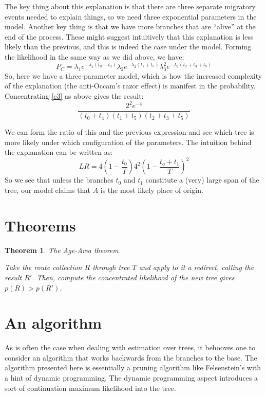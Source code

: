 \documentclass[11pt]{article}
\newtheorem{theorem}{Theorem}
\begin{document}
The key thing about this explanation is that there are three separate migratory events needed to explain things, so we need three exponential parameters in the model. Another key thing is that we have more branches that are ``alive'' at the end of the process. These might suggest intuitively that this explanation is less likely than the previous, and this is indeed the case under the model. Forming the likelihood in the
same way as we did above, we have:
\begin{equation} \label{e3}
P_C = \lambda_1e^{-\lambda_1(t_0+t_4)} \lambda_2 e^{-\lambda_2 (t_1+t_5)}\lambda_3^2 e^{-\lambda_3 (t_2+t_3+t_8)}
\end{equation}
So, here we have a three-parameter model, which is how the increased complexity of the explanation (the anti-Occam's razor effect) is manifest in the probability. Concentrating \ref{e3} as above gives the result:
\begin{equation} \label{e4}
\frac{2^2e^{-4}}{(t_0+t_4)(t_1+t_5)(t_2+t_3+t_5)}
\end{equation}

 We can form the ratio of this and the previous expression and see which tree is more likely under which configuration of the parameters. The intuition behind the explanation can be written as:
 \begin{equation*}
 LR = 4\left({1-\frac{t_0}{T}}\right)4^2\left(1-\frac{t_o+t_1}{T}\right)^2
 \end{equation*}
So we see that unless the branches $t_0$ and $t_1$ constitute a (very) large span of the tree, our model claims that $A$ is the most likely place of origin.

\section{Theorems}

\begin{theorem}{The Age-Area theorem}

Take the route collection $R$ through tree $T$ and apply to it a redirect, calling the result $R'$. Then, compute the concentrated likelihood of the new tree gives $p(R) > p(R')$. 
\end{theorem}


\section{An algorithm}

As is often the case when dealing with estimation over trees, it behooves one to consider an algorithm that works backwards from the branches to the base. The algorithm presented here is essentially a pruning algorithm like Felsenstein's with a hint of dynamic programming. The dynamic programming aspect introduces a sort of continuation maximum likelihood into the tree.
\end{document}
